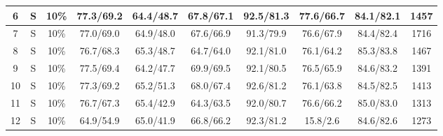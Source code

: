 \begin{table*}
{\begin{tabular}{|c|c|c||c|c|c|c|c|c||c|}
6 & S & 10\% & 77.3/69.2 & 64.4/48.7 & 67.8/67.1 & 92.5/81.3 & 77.6/66.7 & 84.1/82.1 & 1457 \\ \hline
7 & S & 10\% & 77.0/69.0 & 64.9/48.0 & 67.6/66.9 & 91.3/79.9 & 76.6/67.9 & 84.4/82.4 & 1716 \\ \hline
8 & S & 10\% & 76.7/68.3 & 65.3/48.7 & 64.7/64.0 & 92.1/81.0 & 76.1/64.2 & 85.3/83.8 & 1467 \\ \hline
9 & S & 10\% & 77.5/69.4 & 64.2/47.7 & 69.9/69.5 & 92.1/80.5 & 76.5/65.9 & 84.6/83.2 & 1391 \\ \hline
10 & S & 10\% & 77.3/69.2 & 65.2/51.3 & 68.0/67.4 & 92.6/81.2 & 76.1/63.8 & 84.5/82.5 & 1413 \\ \hline
11 & S & 10\% & 76.7/67.3 & 65.4/42.9 & 64.3/63.5 & 92.0/80.7 & 76.6/66.2 & 85.0/83.0 & 1313 \\ \hline
12 & S & 10\% & 64.9/54.9 & 65.0/41.9 & 66.8/66.2 & 92.3/81.2 & 15.8/2.6 & 84.6/82.6 & 1273 \\ \hline
\end{tabular}}
\end{table*}


